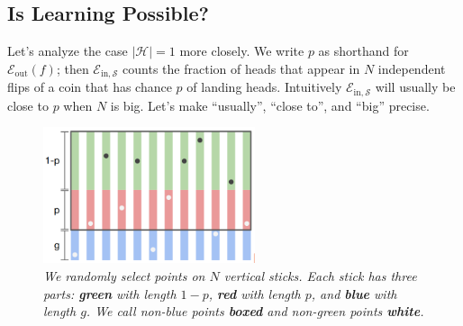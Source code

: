 \documentclass{article}
\newcommand{\Ee}{\mathcal{E}}
\newcommand{\Hh}{\mathcal{H}}
\newcommand{\Ss}{\mathcal{S}}
\begin{document}
        \subsection{Is Learning Possible?}
            Let's analyze the case $|\Hh|=1$ more closely.  We write $p$ as
            shorthand for $\Ee_{\text{out}}(f)$; then $\Ee_{\text{in},\Ss}$
            counts the fraction of heads that appear in $N$ independent flips
            of a coin that has chance $p$ of landing heads.  Intuitively
            $\Ee_{\text{in},\Ss}$ will usually be close to $p$ when $N$ is big.
            Let's make ``usually'', ``close to'', and ``big''  precise.

            \begin{figure}[h!]
                \centering
                \includegraphics[height=4cm]{chernoff}
                \caption{\emph{
                    We randomly select points on $N$ vertical sticks.  Each
                    stick has three parts: \textbf{green} with length $1-p$,
                    \textbf{red} with length $p$, and \textbf{blue} with length
                    $g$.  We call non-blue points \textbf{boxed} and non-green
                    points \textbf{white}.
                }}
            \end{figure}
\end{document}
